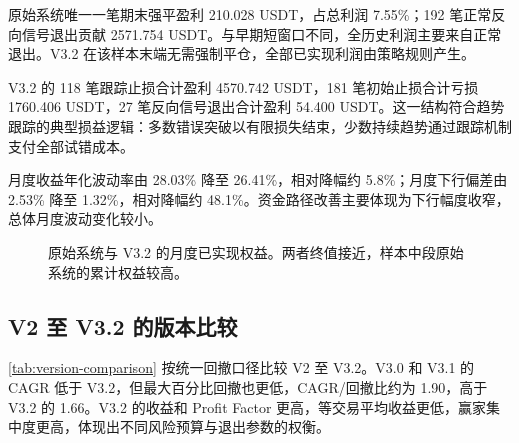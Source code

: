 原始系统唯一一笔期末强平盈利 210.028 USDT，占总利润 7.55\%；192 笔正常反向信号退出贡献 2571.754 USDT。与早期短窗口不同，全历史利润主要来自正常退出。V3.2 在该样本末端无需强制平仓，全部已实现利润由策略规则产生。

V3.2 的 118 笔跟踪止损合计盈利 4570.742 USDT，181 笔初始止损合计亏损 1760.406 USDT，27 笔反向信号退出合计盈利 54.400 USDT。这一结构符合趋势跟踪的典型损益逻辑：多数错误突破以有限损失结束，少数持续趋势通过跟踪机制支付全部试错成本。

月度收益年化波动率由 28.03\% 降至 26.41\%，相对降幅约 5.8\%；月度下行偏差由 2.53\% 降至 1.32\%，相对降幅约 48.1\%。资金路径改善主要体现为下行幅度收窄，总体月度波动变化较小。

\begin{figure}[H]
  \centering
  \caption{原始系统与 V3.2 的月度已实现权益。两者终值接近，样本中段原始系统的累计权益较高。}
  \label{fig:equity-path}
\end{figure}

\subsection{V2 至 V3.2 的版本比较}

\cref{tab:version-comparison} 按统一回撤口径比较 V2 至 V3.2。V3.0 和 V3.1 的 CAGR 低于 V3.2，但最大百分比回撤也更低，CAGR/回撤比约为 1.90，高于 V3.2 的 1.66。V3.2 的收益和 Profit Factor 更高，等交易平均收益更低，赢家集中度更高，体现出不同风险预算与退出参数的权衡。


